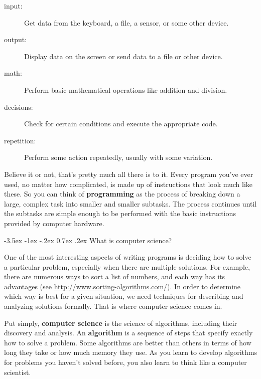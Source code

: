 \documentclass[12pt]{book}
\makeatletter
\theoremstyle{exercise}
\renewcommand{\section}{\@startsection {section}{1}{\z@}%
    {-3.5ex \@plus -1ex \@minus -.2ex}%
    {0.7ex \@plus.2ex}%
    {\normalfont\Large\bfseries}}
\makeatother
\begin{document}
\begin{description}
\item[input:] Get data from the keyboard, a file, a sensor, or some other device.
\item[output:] Display data on the screen or send data to a file or other device.
\item[math:] Perform basic mathematical operations like addition and division.
\item[decisions:] Check for certain conditions and execute the appropriate code.
\item[repetition:] Perform some action repeatedly, usually with some variation.
\end{description}


Believe it or not, that's pretty much all there is to it.
Every program you've ever used, no matter how complicated, is made up of instructions that look much like these.
So you can think of {\bf programming} as the process of breaking down a large, complex task into smaller and smaller subtasks.
The process continues until the subtasks are simple enough to be performed with the basic instructions provided by computer hardware.


\section{What is computer science?}

One of the most interesting aspects of writing programs is deciding how to solve a particular problem, especially when there are multiple solutions.
For example, there are numerous ways to sort a list of numbers, and each way has its advantages (see \url{http://www.sorting-algorithms.com/}).
In order to determine which way is best for a given situation, we need techniques for describing and analyzing solutions formally.
That is where computer science comes in.


Put simply, {\bf computer science} is the science of algorithms, including their discovery and analysis.
An {\bf algorithm} is a sequence of steps that specify exactly how to solve a problem.
Some algorithms are better than others in terms of how long they take or how much memory they use.
As you learn to develop algorithms for problems you haven't solved before, you also learn to think like a computer scientist.
\end{document}
